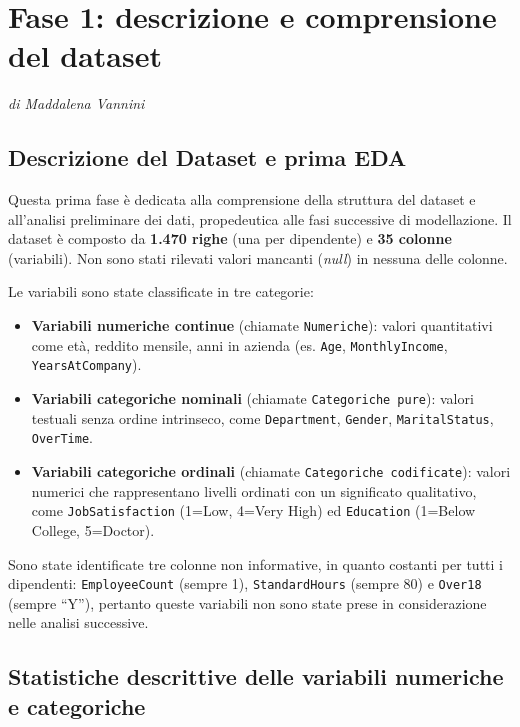 \documentclass[12pt, a4paper]{article}
\begin{document}
\section{Fase 1: descrizione e comprensione del dataset }
\textit{di Maddalena Vannini}

\subsection{Descrizione del Dataset e prima EDA}

Questa prima fase è dedicata alla comprensione della struttura del dataset e all'analisi preliminare dei dati, propedeutica alle fasi successive di modellazione.
Il dataset è composto da \textbf{1.470 righe} (una per dipendente) e \textbf{35 colonne} (variabili). Non sono stati rilevati valori mancanti (\textit{null}) in nessuna delle colonne.
 
Le variabili sono state classificate in tre categorie:
 
\begin{itemize}
    \item \textbf{Variabili numeriche continue} (chiamate \texttt{Numeriche}): valori quantitativi come età, reddito mensile, anni in azienda (es. \texttt{Age}, \texttt{MonthlyIncome}, \texttt{YearsAtCompany}).
    \item \textbf{Variabili categoriche nominali} (chiamate \texttt{Categoriche pure}): valori testuali senza ordine intrinseco, come \texttt{Department}, \texttt{Gender}, \texttt{MaritalStatus}, \texttt{OverTime}.
    \item \textbf{Variabili categoriche ordinali} (chiamate \texttt{Categoriche codificate}): valori numerici che rappresentano livelli ordinati con un significato qualitativo, come \texttt{JobSatisfaction} (1=Low, 4=Very High) ed \texttt{Education} (1=Below College, 5=Doctor).
\end{itemize}
 
Sono state identificate tre colonne non informative, in quanto costanti per tutti i dipendenti: \texttt{EmployeeCount} (sempre 1), \texttt{StandardHours} (sempre 80) e \texttt{Over18} (sempre ``Y''), pertanto queste variabili non sono state prese in considerazione nelle analisi successive.
 

\subsection{Statistiche descrittive delle variabili numeriche e categoriche}
\end{document}
